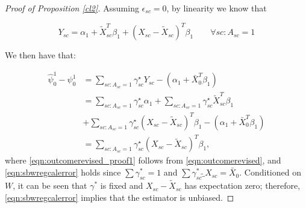 \begin{proof}[Proof of Proposition \ref{cl2}]
Assuming $\epsilon_{sc} = 0$, by linearity we know that

\begin{equation}\label{eqn:outcomerevised}
Y_{sc} = \alpha_1 + \tilde{X}_{sc}^T\beta_1 + (X_{sc} - \tilde{X}_{sc})^T\beta_1 \qquad \forall sc: A_{sc} = 1
\end{equation}

We then have that:

\begin{align}\nonumber
    \hat{\psi}^1_0 - \psi_0^1 &= \sum_{sc: A_{sc} = 1}\gamma_{sc}^\star Y_{sc} - (\alpha_1 + \bar{X}_0^T\beta_1) \\
    \nonumber &= \sum_{sc: A_{sc} = 1}\gamma_{sc}^\star\alpha_1 + \sum_{sc: A_{sc} = 1}\gamma_{sc}^\star\tilde{X}_{sc}^T\beta_1 \\ 
    &+ \sum_{sc: A_{sc} = 1}\gamma_{sc}^\star(X_{sc} - \tilde{X}_{sc})^T\beta_1 - (\alpha_1 + \bar{X}_0^T\beta_1) \label{eqn:outcomerevised_proof1}\\
    &= \sum_{sc: A_{sc} = 1}\gamma_{sc}^\star(X_{sc} - \tilde{X}_{sc})^T\beta_1\label{eqn:sbwregcalerror},
\end{align}
where \eqref{eqn:outcomerevised_proof1} follows from \eqref{eqn:outcomerevised}, and \eqref{eqn:sbwregcalerror} holds since $\sum \gamma_{sc}^* = 1$ and $\sum \gamma_{sc}^* \tilde_{X}_{sc} = \bar{X}_0$. Conditioned on $W$, it can be seen that $\gamma^*$ is fixed and $X_{sc} - \tilde{X}_{sc}$ has expectation zero; therefore, \eqref{eqn:sbwregcalerror} implies that the estimator is unbiased.
\end{proof}


